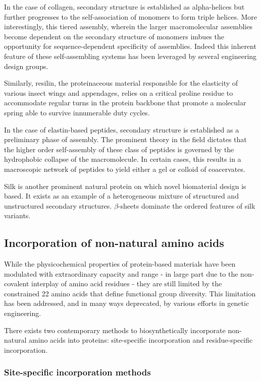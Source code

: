 In the case of collagen, secondary structure is established as alpha-helices but
further progresses to the self-association of monomers to form triple helices.
More interestingly, this tiered assembly, wherein the larger macromolecular
assemblies become dependent on the secondary structure of monomers imbues the
opportunity for sequence-dependent specificity of assemblies. Indeed this
inherent feature of these self-assembling systems has been leveraged by several
engineering design groups.\cite{}

Similarly, resilin, the proteinaceous material responsible for the elasticity of
various insect wings and appendages, relies on a critical proline residue to
accommodate regular turns in the protein backbone that promote a molecular
spring able to survive innumerable duty cycles.\cite{}

In the case of elastin-based peptides, secondary structure is established as a
preliminary phase of assembly. The prominent theory in the field dictates that
the higher order self-assembly of these class of peptides is governed by the
hydrophobic collapse of the macromolecule. In certain cases, this results in a
macroscopic network of peptides to yield either a gel or colloid of
coacervates.\cite{}

Silk is another prominent natural protein on which novel biomaterial design is
based. It exists as an example of a heterogeneous mixture of structured and
unstructured secondary structures.  $\beta$-sheets dominate the ordered features
of silk variants.

\subsection{Incorporation of non-natural amino acids}

While the physicochemical properties of protein-based materials have been
modulated with extraordinary capacity and range\cite{} - in large part due to
the non-covalent interplay of amino acid residues - they are still limited by
the constrained 22 amino acids that define functional group diversity.\cite{}
This limitation has been addressed, and in many ways deprecated, by various
efforts in genetic engineering.\cite{} 

There exists two contemporary methods to biosynthetically incorporate
non-natural amino acids into proteins: site-specific incorporation and
residue-specific incorporation.

\subsubsection{Site-specific incorporation methods} 

